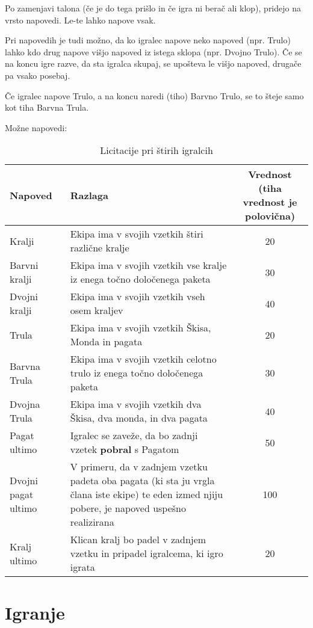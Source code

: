 \documentclass[a4paper, ]{report}
\begin{document}
Po zamenjavi talona (če je do tega prišlo in če igra ni berač ali klop), pridejo na vrsto napovedi. Le-te lahko napove vsak.

Pri napovedih je tudi možno, da ko igralec napove neko napoved (npr. Trulo) lahko kdo drug napove višjo napoved iz istega sklopa (npr. Dvojno Trulo). Če se na koncu igre razve, da sta igralca skupaj, se upošteva le višjo napoved, drugače pa vsako posebaj.

Če igralec napove Trulo, a na koncu naredi (tiho) Barvno Trulo, se to šteje samo kot tiha Barvna Trula.

Možne napovedi:
\begin{table}
  \caption{Licitacije pri štirih igralcih}
  \begin{tabularx}{\textwidth}{lXc}
    \hline \hline
    \textbf{Napoved} & \textbf{Razlaga} & \parbox{25mm}{\textbf{Vrednost} \\ (tiha vrednost je polovična)} \\ \hline \hline
    Kralji & Ekipa ima v svojih vzetkih štiri različne kralje & 20 \\
    Barvni kralji & Ekipa ima v svojih vzetkih vse kralje iz enega točno določenega paketa & 30 \\ %
    Dvojni kralji & Ekipa ima v svojih vzetkih vseh osem kraljev & 40 \\ \hline
    Trula & Ekipa ima v svojih vzetkih Škisa, Monda in pagata & 20 \\
    Barvna Trula & Ekipa ima v svojih vzetkih celotno trulo iz enega točno določenega paketa & 30 \\ %
    Dvojna Trula & Ekipa ima v svojih vzetkih dva Škisa, dva monda, in dva pagata & 40 \\ \hline
    Pagat ultimo & Igralec se zaveže, da bo zadnji vzetek \textbf{pobral} s Pagatom & 50 \\
    Dvojni pagat ultimo & V primeru, da v zadnjem vzetku padeta oba pagata (ki sta ju vrgla člana iste ekipe) te eden izmed njiju pobere, je napoved uspešno realizirana & 100 \\ \hline
    Kralj ultimo & Klican kralj bo padel v zadnjem vzetku in pripadel igralcema, ki igro igrata & 20 \\
    \hline \hline
  \end{tabularx}
\end{table}

\chapter{Igranje}
\end{document}

